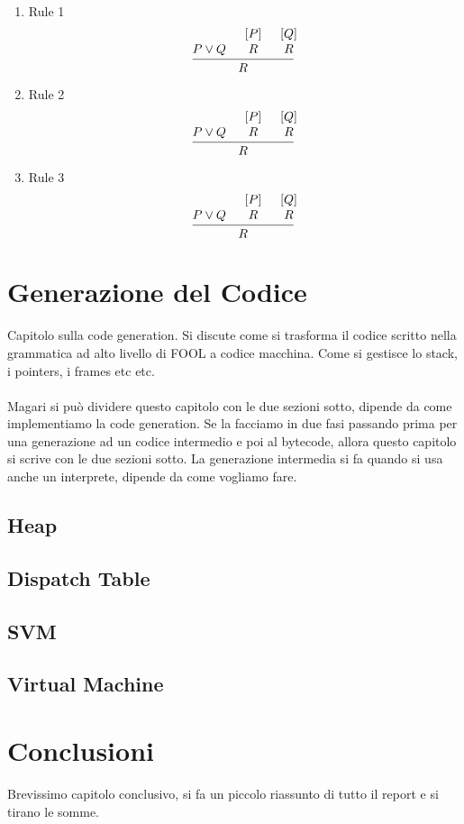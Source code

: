 \documentclass{scrreprt}
\begin{document}
\begin{enumerate}

    \item Rule 1
        \[
            \begin{prooftree}
                \Hypo{P \lor Q}
                \Hypo {[P]}
                \Infer [rule style=no rule] 1 {R}
                \Hypo {[Q]}
                \Infer [rule style=no rule] 1 {R}
                \Infer3{R}
            \end{prooftree}
        \]
    
    \item Rule 2
        \[
            \begin{prooftree}
                \Hypo{P \lor Q}
                \Hypo {[P]}
                \Infer [rule style=no rule] 1 {R}
                \Hypo {[Q]}
                \Infer [rule style=no rule] 1 {R}
                \Infer3{R}
            \end{prooftree}
        \]
    
    \item Rule 3
        \[
            \begin{prooftree}
                \Hypo{P \lor Q}
                \Hypo {[P]}
                \Infer [rule style=no rule] 1 {R}
                \Hypo {[Q]}
                \Infer [rule style=no rule] 1 {R}
                \Infer3{R}
            \end{prooftree}
        \]


\end{enumerate}

\chapter{Generazione del Codice}
Capitolo sulla code generation. Si discute come si trasforma il codice scritto nella grammatica
ad alto livello di FOOL a codice macchina. Come si gestisce lo stack, i pointers, i frames etc etc.\\
\\
Magari si può dividere questo capitolo con le due sezioni sotto, dipende da come implementiamo la code 
generation. Se la facciamo in due fasi passando prima per una generazione ad un codice intermedio e 
poi al bytecode, allora questo capitolo si scrive con le due sezioni sotto.
La generazione intermedia si fa quando si usa anche un interprete, dipende da come vogliamo fare.

\section{Heap}
\section{Dispatch Table}
\section{SVM}
\section{Virtual Machine}

\chapter{Conclusioni}
Brevissimo capitolo conclusivo, si fa un piccolo riassunto di tutto il report e si tirano le somme.
\end{document}
